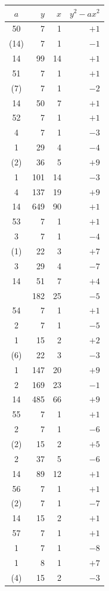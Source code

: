 \documentclass[11pt]{article}
\begin{document}
\begin{center}
\renewcommand{\arraystretch}{1.05}
\begin{tabular}{|c|r|r|r|}
\hline
$a$ & $y$ & $x$ & $y^2 - ax^2$ \\
\hline
50 & 7 & 1 & $+1$ \\
(14) & 7 & 1 & $-1$ \\
14 & 99 & 14 & $+1$ \\
\hline
51 & 7 & 1 & $+1$ \\
(7) & 7 & 1 & $-2$ \\
14 & 50 & 7 & $+1$ \\
\hline
52 & 7 & 1 & $+1$ \\
4 & 7 & 1 & $-3$ \\
1 & 29 & 4 & $-4$ \\
(2) & 36 & 5 & $+9$ \\
1 & 101 & 14 & $-3$ \\
4 & 137 & 19 & $+9$ \\
14 & 649 & 90 & $+1$ \\
\hline
53 & 7 & 1 & $+1$ \\
3 & 7 & 1 & $-4$ \\
(1) & 22 & 3 & $+7$ \\
3 & 29 & 4 & $-7$ \\
14 & 51 & 7 & $+4$ \\
 & 182 & 25 & $-5$ \\
\hline
54 & 7 & 1 & $+1$ \\
2 & 7 & 1 & $-5$ \\
1 & 15 & 2 & $+2$ \\
(6) & 22 & 3 & $-3$ \\
1 & 147 & 20 & $+9$ \\
2 & 169 & 23 & $-1$ \\
14 & 485 & 66 & $+9$ \\
\hline
55 & 7 & 1 & $+1$ \\
2 & 7 & 1 & $-6$ \\
(2) & 15 & 2 & $+5$ \\
2 & 37 & 5 & $-6$ \\
14 & 89 & 12 & $+1$ \\
\hline
56 & 7 & 1 & $+1$ \\
(2) & 7 & 1 & $-7$ \\
14 & 15 & 2 & $+1$ \\
\hline
57 & 7 & 1 & $+1$ \\
1 & 7 & 1 & $-8$ \\
1 & 8 & 1 & $+7$ \\
(4) & 15 & 2 & $-3$ \\

\end{tabular}
\end{center}
\end{document}
